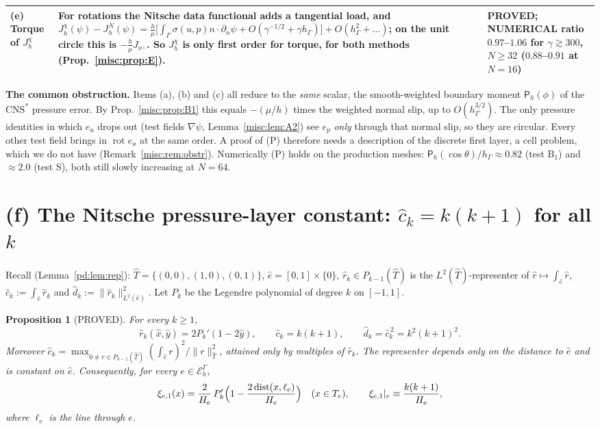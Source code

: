 \documentclass[11pt,reqno]{amsart}
\theoremstyle{plain}
\newtheorem{proposition}[theorem]{Proposition}
\theoremstyle{definition}
\newcommand{\hG}{h_\Gamma}
\newcommand{\EG}{\mathcal E_h^\Gamma}
\newcommand{\dn}{\partial_n}
\newcommand{\norm}[1]{\lVert #1\rVert}
\newcommand{\CNS}{\mathrm{CNS}^\ast}
\DeclareMathOperator{\dist}{dist}
\DeclareMathOperator{\rot}{rot}
\newcommand{\chat}{\hat c_k}
\newcommand{\Pm}{\mathsf P_h}     %
\begin{document}
\begin{center}
\begin{tabular}{>{\raggedright\arraybackslash}p{}>{\raggedright\arraybackslash}p{}>{\raggedright\arraybackslash}p{}}
(e) Torque of $J^\chi_h$ & For rotations the Nitsche data functional adds a tangential load, and $J^\chi_h(\psi)-J^N_h(\psi)=\frac h\mu\bigl[\int_\Gamma\sigma(u,p)n\cdot\dn\psi+O(\gamma^{-1/2}+\gamma\hG)\bigr]+O(\hG^2+\dots)$; on the unit circle this is $-\frac h\mu J_{x^\perp}$. So $J^\chi_h$ is only first order for torque, for both methods (Prop.~\ref{misc:prop:E}). & PROVED; NUMERICAL ratio $0.97$--$1.06$ for $\gamma\gtrsim300$, $N\ge32$ ($0.88$--$0.91$ at $N=16$)\\
\bottomrule
\end{tabular}
\end{center}

\noindent\textbf{The common obstruction.} Items (a), (b) and (c) all reduce to the \emph{same} scalar, the smooth-weighted boundary moment $\Pm(\phi)$ of the $\CNS$ pressure error. By Prop.~\ref{misc:prop:B1} this equals $-(\mu/h)$ times the weighted normal slip, up to $O(\hG^{3/2})$. The only pressure identities in which $e_u$ drops out (test fields $\nabla\psi$, Lemma~\ref{misc:lem:A2}) see $e_p$ \emph{only} through that normal slip, so they are circular. Every other test field brings in $\rot e_u$ at the same order. A proof of (P) therefore needs a description of the discrete first layer, a cell problem, which we do not have (Remark~\ref{misc:rem:obstr}). Numerically (P) holds on the production meshes: $\Pm(\cos\theta)/\hG\approx0.82$ (test B$_1$) and $\approx2.0$ (test S), both still slowly increasing at $N=64$.

\section{(f) The Nitsche pressure-layer constant: \texorpdfstring{$\chat=k(k+1)$}{c_k=k(k+1)} for all \texorpdfstring{$k$}{k}}\label{misc:sec:chat}

Recall (Lemma~\ref{pd:lem:rep}): $\hat T=\{(0,0),(1,0),(0,1)\}$, $\hat e=[0,1]\times\{0\}$, $\hat r_k\in P_{k-1}(\hat T)$ is the $L^2(\hat T)$-representer of $\hat r\mapsto\int_{\hat e}\hat r$, $\chat:=\int_{\hat e}\hat r_k$ and $\hat d_k:=\norm{\hat r_k}^2_{L^2(\hat e)}$. Let $P_k$ be the Legendre polynomial of degree $k$ on $[-1,1]$.

\begin{proposition}[PROVED]\label{misc:prop:chat}
For every $k\ge1$,
\[
\hat r_k(\hat x,\hat y)=2P_k'(1-2\hat y),\qquad \chat=k(k+1),\qquad \hat d_k=\chat^{\,2}=k^2(k+1)^2 .
\]
Moreover $\chat=\max_{0\ne r\in P_{k-1}(\hat T)}(\int_{\hat e}r)^2/\norm r^2_{\hat T}$, attained only by multiples of $\hat r_k$. The representer depends only on the distance to $\hat e$ and is constant on $\hat e$. Consequently, for every $e\in\EG$,
\[
\xi_{e,1}(x)=\frac{2}{H_e}\,P_k'\Bigl(1-\frac{2\dist(x,\ell_e)}{H_e}\Bigr)\quad(x\in T_e),\qquad \xi_{e,1}|_e\equiv\frac{k(k+1)}{H_e},
\]
where $\ell_e$ is the line through $e$.
\end{proposition}
\end{document}
